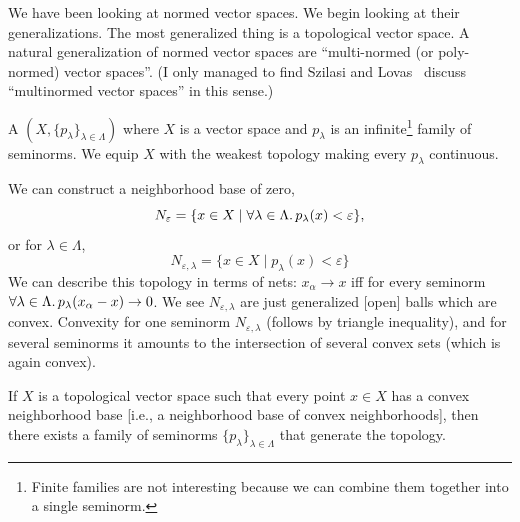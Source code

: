 

\begin{node}
We have been looking at normed vector spaces. We begin looking at
their generalizations. The most generalized thing is a topological
vector space. A natural generalization of normed vector spaces are
``multi-normed (or poly-normed) vector spaces''. (I only managed to
find Szilasi and Lovas~\cite[p.1077]{szilasi2007some} discuss ``multinormed
vector spaces'' in this sense.)
\end{node}

\begin{definition}
A  $(X,\{p_{\lambda}\}_{\lambda\in\Lambda})$
where $X$ is a vector space and $p_{\lambda}$ is an
infinite\footnote{Finite families are not interesting because we can
combine them together into a single seminorm.} family of
seminorms. We equip $X$ with the weakest topology making every
$p_{\lambda}$ continuous.

We can construct a neighborhood base of zero,
\begin{equation}
N_{\varepsilon}=\{x\in X\mid\forall\lambda\in\Lambda\ldotp p_{\lambda}(x)<\varepsilon\},
\end{equation}
or for $\lambda\in\Lambda$,
\begin{equation}
N_{\varepsilon,\lambda}=\{x\in X\mid p_{\lambda}(x)<\varepsilon\}
\end{equation}
We can describe this topology in terms of nets: $x_{\alpha}\to x$
iff for every seminorm $\forall\lambda\in\Lambda\ldotp p_{\lambda}(x_{\alpha}-x)\to0$.
We see $N_{\varepsilon,\lambda}$ are just generalized [open] balls which are
convex. Convexity for one seminorm $N_{\varepsilon,\lambda}$ (follows by triangle inequality),
and for several seminorms it amounts to the intersection of several
convex sets (which is again convex).
\end{definition}

\begin{fact}
If $X$ is a topological vector space such that every point $x\in X$
has a convex neighborhood base [i.e., a neighborhood base of convex
  neighborhoods], then there exists a family of seminorms $\{p_{\lambda}\}_{\lambda\in\Lambda}$
that generate the topology.
\end{fact}

